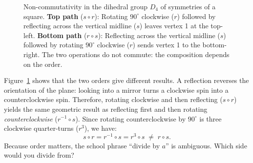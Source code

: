 \begin{figure}[htbp]
\caption{Non-commutativity in the dihedral group $D_4$ of symmetries of a square. \textbf{Top path} ($s \circ r$): Rotating $90^\circ$ clockwise ($r$) followed by reflecting across the vertical midline ($s$) leaves vertex 1 at the top-left. \textbf{Bottom path} ($r \circ s$): Reflecting across the vertical midline ($s$) followed by rotating $90^\circ$ clockwise ($r$) sends vertex 1 to the bottom-right. The two operations do not commute: the composition depends on the order.}\label{36:fig-d4-noncommutative}
\end{figure}

Figure~\ref{36:fig-d4-noncommutative} shows that the two orders give different results. A reflection reverses the orientation of the plane: looking into a mirror turns a clockwise spin into a counterclockwise spin. Therefore, rotating clockwise and then reflecting ($s \circ r$) yields the same geometric result as reflecting first and then rotating \emph{counterclockwise} ($r^{-1} \circ s$). Since rotating counterclockwise by $90^\circ$ is three clockwise quarter-turns ($r^3$), we have:
\[
s \circ r = r^{-1} \circ s = r^3 \circ s \;\neq\; r \circ s.
\]
Because order matters, the school phrase ``divide by $a$'' is ambiguous. Which side would you divide from?

